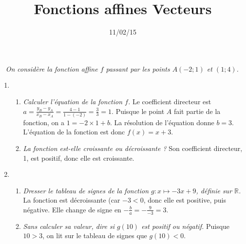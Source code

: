 \documentclass[12pt]{article}
\title{\large Fonctions affines Vecteurs}
\date{11/02/15}
\begin{document}
\maketitle

\begin{exercice}~
  \emph{On considère la fonction affine $f$ passant par les points $A\left( -2;1 \right)$ et $\left( 1;4 \right)$.}
  \begin{enumerate}
    \item 
      \begin{enumerate}
        \item \emph{Calculer l'équation de la fonction $f$.} Le coefficient directeur est $a=\frac{y_B-y_A}{x_B-x_A}=\frac{4-1}{1-\left( -2 \right)}=\frac{3}{3}=1$. Puisque le point $A$ fait partie de la fonction, on a $1=-2\times1+b$. La résolution de l'équation donne $b=3$. L'équation de la fonction est donc $f(x)=x+3$.
        \item \emph{La fonction est-elle croissante ou décroissante ?} Son coefficient directeur, 1, est positif, donc elle est croissante.
      \end{enumerate}
    \item 
      \begin{enumerate}
        \item \emph{Dresser le tableau de signes de la fonction $g:x\mapsto -3x+9$, définie sur $\mathbb{R}$.} La fonction est décroissante (car $-3<0$, donc elle est positive, puis négative. Elle change de signe en $-\frac{b}{a}=-\frac{9}{-3}=3$.
      \begin{center}
      \end{center}
        \item \emph{Sans calculer sa valeur, dire si $g(10)$ est positif ou négatif.} Puisque $10>3$, on lit sur le tableau de signes que $g(10)<0$.
      \end{enumerate}
  \end{enumerate}
\end{exercice}
\end{document}
